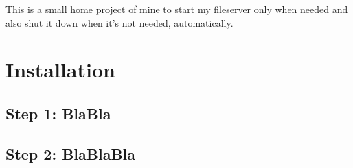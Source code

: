 This is a small home project of mine to start my fileserver only when needed and also shut it down when it's not needed, automatically. \hypertarget{index_install_sec}{}\section{Installation}\label{index_install_sec}
\hypertarget{index_step1}{}\subsection{Step 1: BlaBla}\label{index_step1}
\hypertarget{index_step2}{}\subsection{Step 2: BlaBlaBla}\label{index_step2}
